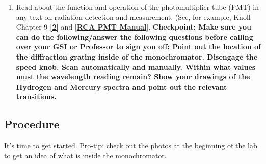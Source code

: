 \documentclass{../lab}
\begin{document}
\begin{enumerate}
    \item Read about the function and operation of the photomultiplier tube (PMT) in any text on radiation detection and measurement. (See, for example, Knoll Chapter 9 \href{http://physics111.lib.berkeley.edu/Physics111/Reprints/Knoll-Radiation\%20Detection\%20&\%20Measurement/01-Radiation\_Detection\_and\_Measurement\_CH\_09.pdf}{\textbf{[2]}} and [\href{http://physics111.lib.berkeley.edu/Physics111/Reprints/GMA/RCA\%20PMT.pdf}{\textbf{RCA PMT Manual}}].
 \textbf{Checkpoint: Make sure you can do the following/answer the following questions before calling over your GSI or Professor to sign you off:
	Point out the location of the diffraction grating inside of the monochromator. Disengage the speed knob. Scan automatically and manually. Within what values must the wavelength reading remain? Show your drawings of the Hydrogen and Mercury spectra and point out the relevant transitions.}

\end{enumerate}

\subsection{Procedure}

It's time to get started. Pro-tip: check out the photos at the beginning of the lab to get an idea of what is inside the monochromator.
\end{document}

